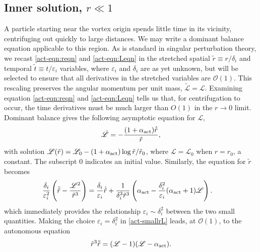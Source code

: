 \documentclass[../Rajarshi-thesis-draft.tex]{subfiles}
\begin{document}
\subsection{Inner solution, $r \ll 1$} 
A particle starting near the vortex origin spends little time in its vicinity, centrifuging out quickly to large distances. We may write a dominant balance equation applicable to this region. As is standard in singular perturbation theory, we recast \eqref{act-eqn:reqn} and \eqref{act-eqn:Leqn} in the stretched spatial $\tilde{r} \equiv r/\delta_i$ and temporal $\tilde{t} \equiv t/\varepsilon_i$ variables, where $\varepsilon_i$ and $\delta_i$ are as yet unknown, but will be selected to ensure that all derivatives in the stretched variables are $\mathcal{O}(1)$. This rescaling preserves the angular momentum per unit mass, $\tilde{\mathscr{L}}  = \mathscr{L}$. Examining equation \eqref{act-eqn:reqn} and \eqref{act-eqn:Leqn} tells us that, for centrifugation to occur, the time derivatives must be much larger than $O(1)$ in the $r \to 0$ limit. Dominant balance gives the following asymptotic equation for $\mathscr{L}$,
\begin{equation}
\dot{\mathscr{L}} = - \frac{(1+\alpha_{\rm act}) \dot{\tilde{r}}}{\tilde{r}},
\label{act-eqnL}
\end{equation} 
with solution $\mathscr{L}(\tilde{r}) = \mathscr{L}_0 -(1+ \alpha_{\rm act})\log{\tilde{r}/\tilde{r}_0}$, where $\mathscr{L} = \mathscr{L}_0$ when $r = r_0$, a constant. The subscript $0$ indicates an initial value. Similarly, the equation for $\tilde{r}$ becomes 
\begin{align}
\label{act-smallrL}
\begin{split}
        \frac{\delta_i}{\varepsilon_i^2}\left( \ddot{\tilde{r}}  - \frac{\mathscr{L}^2}{\tilde{r}^3} \right) &= \frac{\delta_i}{\varepsilon_i}\dot{\tilde{r}} + \frac{1}{\delta_i^3\tilde{r}^3} \left( \alpha_{\rm act} - \frac{\delta_i^2}{\varepsilon_i}(\alpha_{\rm act} + 1)\mathscr{L}\right).
\end{split}
\end{align}
which immediately provides the relationship $\varepsilon_i \sim \delta_i^{2}$ between the two small quantities.
Making the choice $\varepsilon_i = \delta_i^{2}$ in \eqref{act-smallrL} leads, at $\mathcal{O}(1)$, to the autonomous equation 
\begin{equation}
\tilde{r}^3 \ddot{\tilde{r}} = (\mathscr{L}-1)(\mathscr{L}-\alpha_{\rm act}).
\label{act-smallrr}
\end{equation} 
\end{document}
